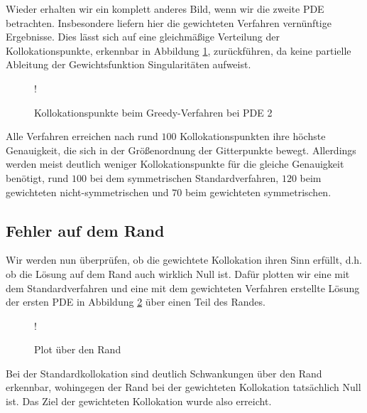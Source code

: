 Wieder erhalten wir ein komplett anderes Bild, wenn wir die zweite \ac{PDE} betrachten. Insbesondere liefern hier die gewichteten Verfahren vernünftige Ergebnisse. Dies lässt sich auf eine gleichmäßige Verteilung der Kollokationspunkte, erkennbar in Abbildung \ref{fig:greedy-points2}, zurückführen, da keine partielle Ableitung der Gewichtsfunktion Singularitäten aufweist. 
\begin{figure}[ht]
\centering
\resizebox {\columnwidth} {!} {

}
\caption{Kollokationspunkte beim Greedy-Verfahren bei \ac{PDE} 2}
\label{fig:greedy-points2}
\end{figure}
Alle Verfahren erreichen nach rund $100$ Kollokationspunkten ihre höchste Genauigkeit, die sich in der Größenordnung der Gitterpunkte bewegt. Allerdings werden meist deutlich weniger Kollokationspunkte für die gleiche Genauigkeit benötigt, rund $100$ bei dem symmetrischen Standardverfahren, $120$ beim gewichteten nicht-symmetrischen und $70$ beim gewichteten symmetrischen.

\subsection{Fehler auf dem Rand}
Wir werden nun überprüfen, ob die gewichtete Kollokation ihren Sinn erfüllt, d.h. ob die Lösung auf dem Rand auch wirklich Null ist. Dafür plotten wir eine mit dem Standardverfahren und eine mit dem gewichteten Verfahren erstellte Lösung der ersten \ac{PDE} in Abbildung \ref{fig:rand-vergleich} über einen Teil des Randes.

\begin{figure}[ht]
\centering
\resizebox {\columnwidth} {!} {

}
\caption{Plot über den Rand}
\label{fig:rand-vergleich}
\end{figure}

Bei der Standardkollokation sind deutlich Schwankungen über den Rand erkennbar, wohingegen der Rand bei der gewichteten Kollokation tatsächlich Null ist. Das Ziel der gewichteten Kollokation wurde also erreicht.

